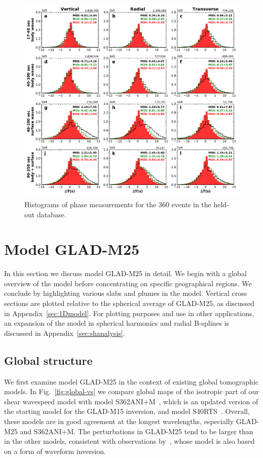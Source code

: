 \documentclass[extra,mreferee]{gji}
\begin{document}
\begin{figure}
  \centering
  \includegraphics[width=\textwidth]{figures/dt_histogram_360.pdf}
  \caption{Histograms of phase measurements for the 360 events in the held-out database.}
  \label{fig:phase_hist_360}
\end{figure}

\section{Model GLAD-M25}
\label{section:model}

In this section we discuss model GLAD-M25 in detail.
We begin with a global overview of the model before concentrating on
specific geographical regions.
We conclude by highlighting various slabs and plumes in the model.
Vertical cross sections are plotted relative to the spherical average of GLAD-M25,
as discussed in Appendix~\ref{sec:1Dmodel}.
For plotting purposes and use in other applications,
an expansion of the model in spherical harmonics and radial B-splines is
discussed in Appendix~\ref{sec:shanalysis}.

\subsection{Global structure}

We first examine model GLAD-M25 in the context of existing global tomographic models.
In Fig.~\ref{fig:global-vs} we compare global maps of the isotropic part of our
shear wavespeed model with model S362ANI$+$M~\citep{moulik2014anisotropic},
which is an updated version of the starting model for the GLAD-M15 inversion,
and model S40RTS~\citep{ritsema2011s40rts}.
Overall, these models are in good agreement
at the longest wavelengths, especially GLAD-M25 and S362ANI$+$M.
The perturbations in GLAD-M25 tend to be larger than in the other models,
consistent with observations by~\cite{french2014whole},
whose model is also based on a form of waveform inversion.
\end{document}
